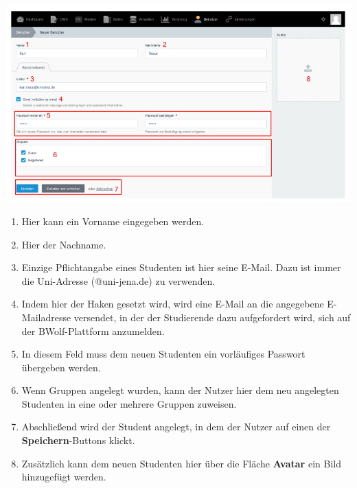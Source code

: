   
  \includegraphics[scale=0.3]{backend/img/neuer_benutzer.png}
  \begin{enumerate}
   \item Hier kann ein Vorname eingegeben werden.
   \item Hier der Nachname.
   \item Einzige Pflichtangabe eines Studenten ist hier seine E-Mail. Dazu ist immer die Uni-Adresse (@uni-jena.de) zu verwenden.
   \item Indem hier der Haken gesetzt wird, wird eine E-Mail an die angegebene E-Mailadresse versendet, in der der Studierende dazu aufgefordert wird, sich auf der BWolf-Plattform anzumelden.
   \item In diesem Feld muss dem neuen Studenten ein vorläufiges Passwort übergeben werden.
   \item Wenn Gruppen angelegt wurden, kann der Nutzer hier dem neu angelegten Studenten in eine oder mehrere Gruppen zuweisen.
   \item Abschließend wird der Student angelegt, in dem der Nutzer auf einen der \textbf{Speichern}-Buttons klickt.
   \item Zusätzlich kann dem neuen Studenten hier über die Fläche \textbf{Avatar} ein Bild hinzugefügt werden.
  \end{enumerate}

